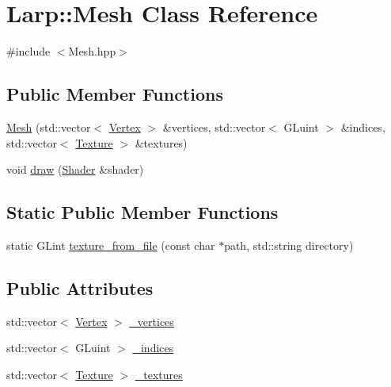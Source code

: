 \hypertarget{classLarp_1_1Mesh}{\section{Larp\-:\-:Mesh Class Reference}
\label{classLarp_1_1Mesh}
}


{\ttfamily \#include $<$Mesh.\-hpp$>$}

\subsection*{Public Member Functions}
\begin{DoxyCompactItemize}
\item 
\hyperlink{classLarp_1_1Mesh_ab7f7199729635bc93d6f8994d8365527}{Mesh} (std\-::vector$<$ \hyperlink{structLarp_1_1Vertex}{Vertex} $>$ \&vertices, std\-::vector$<$ G\-Luint $>$ \&indices, std\-::vector$<$ \hyperlink{classLarp_1_1Texture}{Texture} $>$ \&textures)
\item 
void \hyperlink{classLarp_1_1Mesh_a513ccafd9d38ec3300f4b872fc73c6e0}{draw} (\hyperlink{classLarp_1_1Shader}{Shader} \&shader)
\end{DoxyCompactItemize}
\subsection*{Static Public Member Functions}
\begin{DoxyCompactItemize}
\item 
static G\-Lint \hyperlink{classLarp_1_1Mesh_a5841a3876b33f0f273287afc5ac631f2}{texture\-\_\-from\-\_\-file} (const char $\ast$path, std\-::string directory)
\end{DoxyCompactItemize}
\subsection*{Public Attributes}
\begin{DoxyCompactItemize}
\item 
std\-::vector$<$ \hyperlink{structLarp_1_1Vertex}{Vertex} $>$ \hyperlink{classLarp_1_1Mesh_af77086ebadfb8b0f4fb3c2e5f39d6a43}{\-\_\-vertices}
\item 
std\-::vector$<$ G\-Luint $>$ \hyperlink{classLarp_1_1Mesh_af2ef7e4f28a5454c159d1f2684008926}{\-\_\-indices}
\item 
std\-::vector$<$ \hyperlink{classLarp_1_1Texture}{Texture} $>$ \hyperlink{classLarp_1_1Mesh_a54c9edf45e99fb0261a39bfc3e8ff091}{\-\_\-textures}
\end{DoxyCompactItemize}
